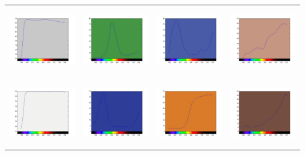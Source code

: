 \documentclass{amsart}
\theoremstyle{definition}
\theoremstyle{remark}
\numberwithin{equation}{section}
\begin{document}
\begin{tabular}{  c c c c }
\includegraphics[width=3.0cm,height=3.0cm]{ch17.jpg}
&
\includegraphics[width=3.0cm,height=3.0cm]{ch18.jpg}
&
\includegraphics[width=3.0cm,height=3.0cm]{ch19.jpg}
&
\includegraphics[width=3.0cm,height=3.0cm]{ch20.jpg}
\\

\includegraphics[width=3.0cm,height=3.0cm]{ch21.jpg}
&
\includegraphics[width=3.0cm,height=3.0cm]{ch22.jpg}
&
\includegraphics[width=3.0cm,height=3.0cm]{ch23.jpg}
&
\includegraphics[width=3.0cm,height=3.0cm]{ch24.jpg}
\end{tabular}
\end{document}
